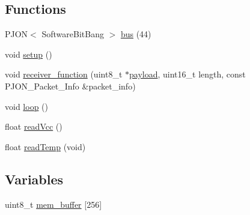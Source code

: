 \subsection*{Functions}
\begin{DoxyCompactItemize}
\item 
P\-J\-O\-N$<$ Software\-Bit\-Bang $>$ \hyperlink{ARDUINO_2Local_2SoftwareBitBang_2DeviceGeneric_2DeviceGeneric_8ino_a538cbe881a4c2d02f3bd441059c41ec4}{bus} (44)
\item 
void \hyperlink{ARDUINO_2Local_2SoftwareBitBang_2DeviceGeneric_2DeviceGeneric_8ino_a4fc01d736fe50cf5b977f755b675f11d}{setup} ()
\item 
void \hyperlink{ARDUINO_2Local_2SoftwareBitBang_2DeviceGeneric_2DeviceGeneric_8ino_a76fc5e73c141f748dcc1809fdcfa1714}{receiver\-\_\-function} (uint8\-\_\-t $\ast$\hyperlink{Uno__Dragino__LoRa__GPS__Shield__TTN_8ino_a78a402d1762842473567de90b11ed256}{payload}, uint16\-\_\-t length, const P\-J\-O\-N\-\_\-\-Packet\-\_\-\-Info \&packet\-\_\-info)
\item 
void \hyperlink{ARDUINO_2Local_2SoftwareBitBang_2DeviceGeneric_2DeviceGeneric_8ino_afe461d27b9c48d5921c00d521181f12f}{loop} ()
\item 
float \hyperlink{ARDUINO_2Local_2SoftwareBitBang_2DeviceGeneric_2DeviceGeneric_8ino_a0b3195c3893f02cb1b80d878b89549d6}{read\-Vcc} ()
\item 
float \hyperlink{ARDUINO_2Local_2SoftwareBitBang_2DeviceGeneric_2DeviceGeneric_8ino_ada109bb0cdc12131465dfe7a74f93b1e}{read\-Temp} (void)
\end{DoxyCompactItemize}
\subsection*{Variables}
\begin{DoxyCompactItemize}
\item 
uint8\-\_\-t \hyperlink{ARDUINO_2Local_2SoftwareBitBang_2DeviceGeneric_2DeviceGeneric_8ino_a02235b4e96743403348a58d554caa3dc}{mem\-\_\-buffer} \mbox{[}256\mbox{]}
\end{DoxyCompactItemize}



